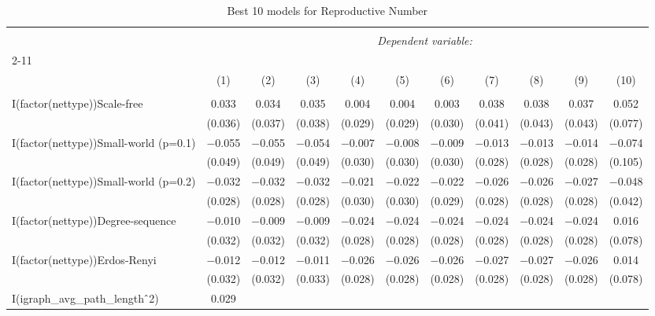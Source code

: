
\begin{table}[!htbp] \centering 
  \caption{Best 10 models for Reproductive Number} 
  \label{tab:best_models_rep_num} 
\begin{tabular}{@{\extracolsep{5pt}}lcccccccccc} 
\\[-1.8ex]\hline 
\hline \\[-1.8ex] 
 & \multicolumn{10}{c}{\textit{Dependent variable:}} \\ 
\cline{2-11} 
\\[-1.8ex] & (1) & (2) & (3) & (4) & (5) & (6) & (7) & (8) & (9) & (10)\\ 
\hline \\[-1.8ex] 
 I(factor(nettype))Scale-free & 0.033 & 0.034 & 0.035 & 0.004 & 0.004 & 0.003 & 0.038 & 0.038 & 0.037 & 0.052 \\ 
  & (0.036) & (0.037) & (0.038) & (0.029) & (0.029) & (0.030) & (0.041) & (0.043) & (0.043) & (0.077) \\ 
  I(factor(nettype))Small-world (p=0.1) & $-$0.055 & $-$0.055 & $-$0.054 & $-$0.007 & $-$0.008 & $-$0.009 & $-$0.013 & $-$0.013 & $-$0.014 & $-$0.074 \\ 
  & (0.049) & (0.049) & (0.049) & (0.030) & (0.030) & (0.030) & (0.028) & (0.028) & (0.028) & (0.105) \\ 
  I(factor(nettype))Small-world (p=0.2) & $-$0.032 & $-$0.032 & $-$0.032 & $-$0.021 & $-$0.022 & $-$0.022 & $-$0.026 & $-$0.026 & $-$0.027 & $-$0.048 \\ 
  & (0.028) & (0.028) & (0.028) & (0.030) & (0.030) & (0.029) & (0.028) & (0.028) & (0.028) & (0.042) \\ 
  I(factor(nettype))Degree-sequence & $-$0.010 & $-$0.009 & $-$0.009 & $-$0.024 & $-$0.024 & $-$0.024 & $-$0.024 & $-$0.024 & $-$0.024 & 0.016 \\ 
  & (0.032) & (0.032) & (0.032) & (0.028) & (0.028) & (0.028) & (0.028) & (0.028) & (0.028) & (0.078) \\ 
  I(factor(nettype))Erdos-Renyi & $-$0.012 & $-$0.012 & $-$0.011 & $-$0.026 & $-$0.026 & $-$0.026 & $-$0.027 & $-$0.027 & $-$0.026 & 0.014 \\ 
  & (0.032) & (0.032) & (0.033) & (0.028) & (0.028) & (0.028) & (0.028) & (0.028) & (0.028) & (0.078) \\ 
  I(igraph\_avg\_path\_length$\hat{\mkern6mu}$2) & 0.029 &  &  &  &  &  &  &  &  &  \\ 

\end{tabular}
\end{table}
